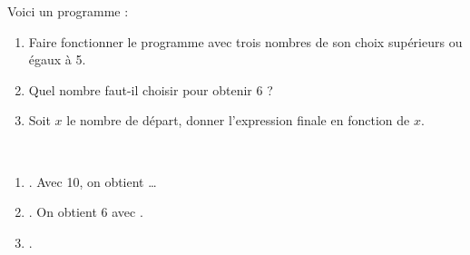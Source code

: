 \begin{exercice*}
   Voici un programme :
   \begin{enumerate}
      \item Faire fonctionner le programme avec trois nombres de son choix supérieurs ou égaux à 5.
      \item Quel nombre faut-il choisir pour obtenir 6 ?
      \item Soit $x$ le nombre de départ, donner l'expression finale en fonction de $x$.
   \end{enumerate}
\end{exercice*}

\begin{corrige}
   \ \\ [-5mm]
   \begin{enumerate}
      \item {}. Avec 10, on obtient {} \dots
      \item {}. On obtient 6 avec {}.
      \item {}.
   \end{enumerate}
\end{corrige}